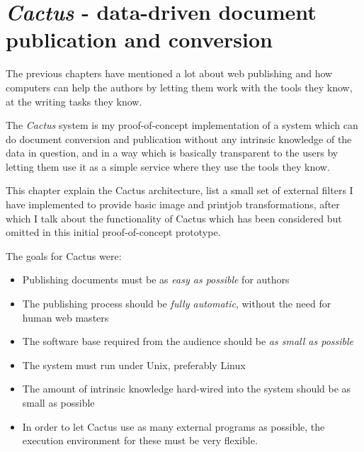 %
%


\chapter{\textit{Cactus} - data-driven document publication
 and conversion}

\label{cha:cactus}
\label{sec:cactus}


The previous chapters have mentioned a lot about web
publishing and how computers can help the authors by letting
them work with the tools they know, at the writing tasks
they know.

The \textit{Cactus} system is my proof-of-concept
implementation of a system which can do document conversion
and publication without any intrinsic knowledge of the data
in question, and in a way which is basically transparent to
the users by letting them use it as a simple service where
they use the tools they know.

This chapter explain the Cactus architecture,
 list a small set
of external filters I have implemented to provide basic
image and printjob transformations, after which I talk about the
functionality of Cactus which has been considered but omitted in this
initial proof-of-concept prototype.

The goals for Cactus were:

\begin{itemize}
\item Publishing documents must be as \textit{easy as
    possible} for authors
  
\item The publishing process should be \textit{fully
    automatic}, without the need for human web masters
  
\item The software base required from the audience should be
  \textit{as small as possible}
  
\item The system must run under Unix, preferably Linux
  
\item The amount of intrinsic knowledge hard-wired into the
  system should be as small as possible

\item In order to let Cactus use as many external programs as
  possible, the execution environment for these must be very
  flexible. 
\end{itemize}

